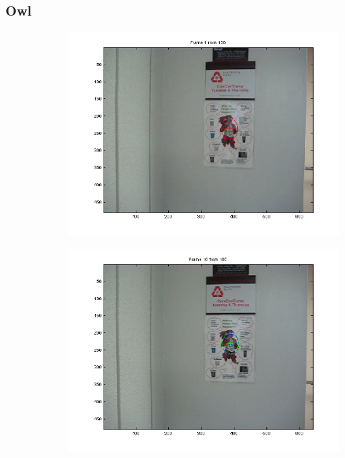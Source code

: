 \documentclass[hyperref={pdfpagelabels=false}]{beamer}
\begin{document}
\begin{frame}
\frametitle{Owl}
\begin{figure}
         \centering
         \begin{subfigure}[b]{0.3\textwidth}
                 \includegraphics[width=\textwidth]{results/owl/Frame0001.png}
         \end{subfigure}%
         \begin{subfigure}[b]{0.3\textwidth}
                 \includegraphics[width=\textwidth]{results/owl/Frame0010.png}
         \end{subfigure}
         \begin{subfigure}[b]{0.3\textwidth}

\end{subfigure}
\end{figure}
\end{frame}
\end{document}
